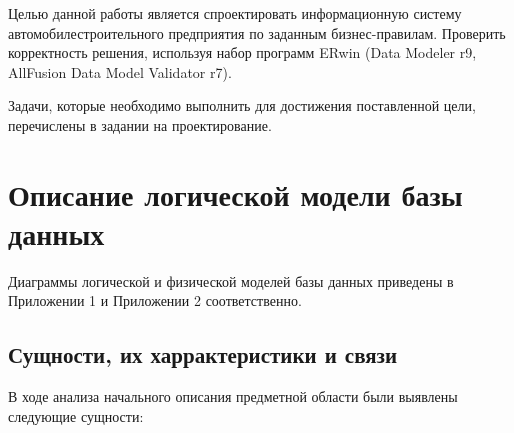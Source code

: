 Целью данной работы является спроектировать информационную систему автомобилестроительного предприятия по заданным бизнес-правилам.
Проверить корректность решения, используя набор программ ERwin (Data Modeler r9, AllFusion Data Model Validator r7).

Задачи, которые необходимо выполнить для достижения поставленной цели, перечислены в задании на проектирование.

\newpage

\section{Описание логической модели базы данных}

Диаграммы логической и физической моделей базы данных приведены в Приложении 1 и Приложении 2 соответственно.

\subsection{Сущности, их харрактеристики и связи}
В ходе анализа начального описания предметной области были выявлены следующие сущности:

